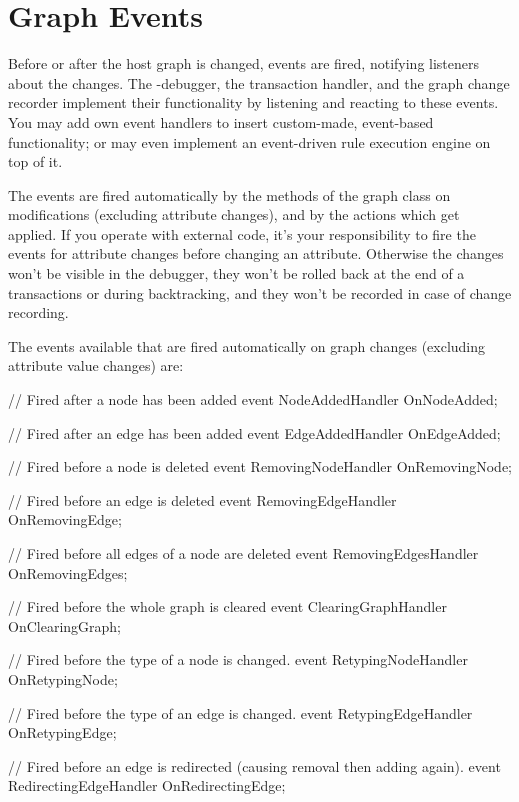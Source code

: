 \section{Graph Events}\label{sec:graphevent}

Before or after the host graph is changed, events are fired, notifying listeners about the changes.
The \GrShell-debugger, the transaction handler, and the graph change recorder implement their functionality by listening and reacting to these events.
You may add own event handlers to insert custom-made, event-based functionality;
or may even implement an event-driven rule execution engine on top of it.

The events are fired automatically by the methods of the graph class on modifications (excluding attribute changes),
and by the actions which get applied.
If you operate with external code, it's your responsibility to fire the events for attribute changes before changing an attribute.
Otherwise the changes won't be visible in the debugger, they won't be rolled back at the end of a transactions or during backtracking, and they won't be recorded in case of change recording.

The events available that are fired automatically on graph changes (excluding attribute value changes) are:

\begin{csharplet}
// Fired after a node has been added
event NodeAddedHandler OnNodeAdded;

// Fired after an edge has been added
event EdgeAddedHandler OnEdgeAdded;

// Fired before a node is deleted
event RemovingNodeHandler OnRemovingNode;

// Fired before an edge is deleted
event RemovingEdgeHandler OnRemovingEdge;

// Fired before all edges of a node are deleted
event RemovingEdgesHandler OnRemovingEdges;

// Fired before the whole graph is cleared
event ClearingGraphHandler OnClearingGraph;

// Fired before the type of a node is changed.
event RetypingNodeHandler OnRetypingNode;

// Fired before the type of an edge is changed.
event RetypingEdgeHandler OnRetypingEdge;

// Fired before an edge is redirected (causing removal then adding again).
event RedirectingEdgeHandler OnRedirectingEdge;
\end{csharplet}

